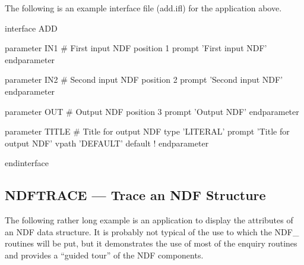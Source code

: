 \documentclass[twoside,11pt,nolof]{starlink}
\begin{document}
The following is an example  interface file
(add.ifl) for the application above.

\small
\begin{terminalv}
   interface ADD

      parameter IN1                 # First input NDF
         position 1
         prompt   'First input NDF'
      endparameter

      parameter IN2                 # Second input NDF
         position 2
         prompt   'Second input NDF'
      endparameter

      parameter OUT                 # Output NDF
         position 3
         prompt   'Output NDF'
      endparameter

      parameter TITLE               # Title for output NDF
         type     'LITERAL'
         prompt   'Title for output NDF'
         vpath    'DEFAULT'
         default  !
      endparameter

   endinterface
\end{terminalv}
\normalsize

\newpage
\subsection{\label{ss:tracingndf}NDFTRACE --- Trace an NDF Structure}

The following rather long example is an application to display the attributes of
an NDF data structure.
It is probably not typical of the use to which the NDF\_ routines will be
put, but it demonstrates the use of most of the enquiry routines and
provides a ``guided tour'' of the NDF components.
\end{document}
